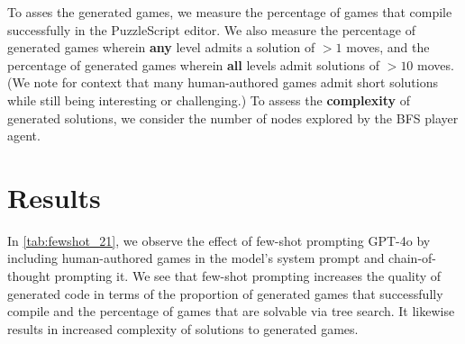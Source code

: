 \documentclass[conference]{IEEEtran}
\begin{document}
To asses the generated games, we measure the percentage of games that compile successfully in the PuzzleScript editor. We also measure the percentage of generated games wherein \textbf{any} level admits a solution of $>1$ moves, and the percentage of generated games wherein \textbf{all} levels admit solutions of $>10$ moves. (We note for context that many human-authored games admit short solutions while still being interesting or challenging.) To assess the \textbf{complexity} of generated solutions, we consider the number of nodes explored by the BFS player agent.



\section{Results}

\begin{table}
\begin{center}
\caption{Effect of few-shot prompting GPT-4o by including a random subset of high-quality human-authored games in the prompt during code generation and repair (up to 30k tokens worth). Results aggregated over 20 game generation trials.}

\label{tab:fewshot_21}
\end{center}
\end{table}

\begin{table}
\begin{center}
\caption{Comparison between models, each generating $10$ games using fewshot prompting and a context length of 10k tokens.}

\label{tab:models}
\end{center}
\end{table}


In \autoref{tab:fewshot_21}, we observe the effect of few-shot prompting GPT-4o by including human-authored games in the model's system prompt and chain-of-thought prompting it. We see that few-shot prompting increases the quality of generated code in terms of the proportion of generated games that successfully compile and the percentage of games that are solvable via tree search. It likewise results in increased complexity of solutions to generated games.
\end{document}
